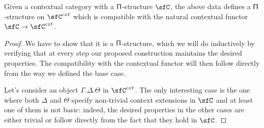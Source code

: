 \begin{prop}
  Given a contextual category with a $\operatorname{\mathsf{\Pi}}$-structure $\sfC$, the above data
  defines a $\operatorname{\mathsf{\Pi}}$-structure on $\sfC^{cxt}$ which is compatible with the natural
  contextual functor $\sfC\rightarrow\sfC^{cxt}$.
\end{prop}
\begin{proof}
  We have to
  show that it is a $\operatorname{\mathsf{\Pi}}$-structure, which we will do inductively by verifying
  that at every step our proposed construction maintains the desired properties.
  The compatibility with the contextual functor will then follow directly from
  the way we defined the base case.

  Let's consider an object $\Gamma.\Delta.\Theta$ in $\sfC^{cxt}$. The only
  interesting case is the one where both $\Delta$ and $\Theta$
  specify non-trivial context extensions in $\sfC$ and at least one of them is
  not basic: indeed, the desired properties in the other cases are either
  trivial or follow directly from the fact that they hold in $\sfC$.


\end{proof}
